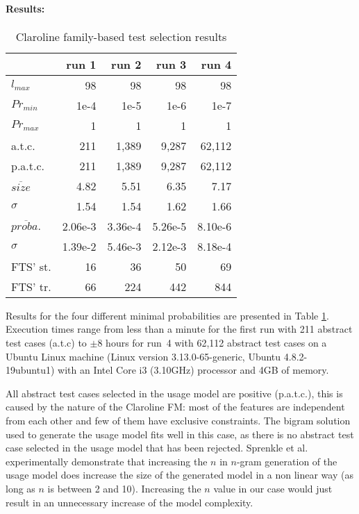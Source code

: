\paragraph{Results:}

\begin{table}[t]
\centering
\caption{Claroline family-based test selection results}
\label{tab:familybased:claroline}
\begin{small}
\begin{tabular}{lrrrr} 
\hline
	& \textbf{run 1}	& \textbf{run 2}	& \textbf{run 3}	& \textbf{run 4} \\
\hline
$l_{max}$			& 98	 		& 98	  	& 98		& 98 	\\
$Pr_{min}$ 			& 1e-4		& 1e-5 	& 1e-6	& 1e-7	\\
$Pr_{max}$			& 1 	 		& 1	  	& 1		& 1	\\
a.t.c.				& 211 		& 1,389 	& 9,287 	& 62,112	 \\
p.a.t.c. 			& 211 		& 1,389 	& 9,287 	& 62,112 \\
$\overline{size}$ 	& 4.82 		& 5.51 	& 6.35 	& 7.17	\\
$\sigma$ 			& 1.54 		& 1.54 	& 1.62 	& 1.66	\\
$\overline{proba.}$ 	& 2.06e-3 	& 3.36e-4 	& 5.26e-5 	& 8.10e-6	\\
$\sigma$				& 1.39e-2 	& 5.46e-3 	& 2.12e-3 	& 8.18e-4	\\
FTS' st.				& 16 		& 36 	& 50 	& 69	\\
FTS' tr. 			& 66 		& 224 	& 442 	& 844	\\
\hline
\end{tabular}
\end{small}
\end{table}

Results for the four different minimal probabilities are presented in Table \ref{tab:familybased:claroline}.
Execution times range from less than a minute for the first run with 211 abstract test cases (a.t.c) to $\pm 8$ hours for run~4 with 62,112 abstract test cases on a Ubuntu Linux machine (Linux version 3.13.0-65-generic, Ubuntu 4.8.2-19ubuntu1) with an Intel Core i3 (3.10GHz) processor and 4GB of memory.

All abstract test cases selected in the usage model are positive (p.a.t.c.), this is caused by the nature of the Claroline FM: most of the features are independent from each other and few of them have exclusive constraints. The bigram solution used to generate the usage model fits well in this case, as there is no abstract test case selected in the usage model that has been rejected. Sprenkle et al. \cite{Sprenkle2013} experimentally demonstrate that increasing the $n$ in $n$-gram generation of the usage model does increase the size of the generated model in a non linear way (as long as $n$ is between 2 and 10). Increasing the $n$ value in our case would just result in an unnecessary increase of the model complexity.

